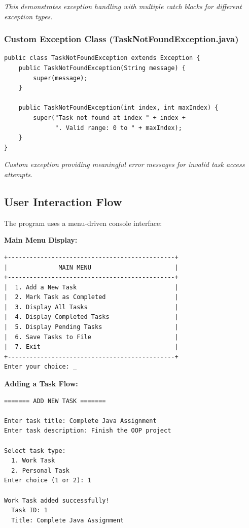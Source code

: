 \documentclass[12pt,a4paper]{article}
\begin{document}
\textit{This demonstrates exception handling with multiple catch blocks for different exception types.}

\subsubsection{Custom Exception Class (TaskNotFoundException.java)}

\begin{lstlisting}[caption={Custom Exception Class}]
public class TaskNotFoundException extends Exception {
    public TaskNotFoundException(String message) {
        super(message);
    }
    
    public TaskNotFoundException(int index, int maxIndex) {
        super("Task not found at index " + index + 
              ". Valid range: 0 to " + maxIndex);
    }
}
\end{lstlisting}

\textit{Custom exception providing meaningful error messages for invalid task access attempts.}

\subsection{User Interaction Flow}

The program uses a menu-driven console interface:

\textbf{Main Menu Display:}
\begin{minipage}{\linewidth}
\begin{verbatim}
+----------------------------------------------+
|              MAIN MENU                       |
+----------------------------------------------+
|  1. Add a New Task                           |
|  2. Mark Task as Completed                   |
|  3. Display All Tasks                        |
|  4. Display Completed Tasks                  |
|  5. Display Pending Tasks                    |
|  6. Save Tasks to File                       |
|  7. Exit                                     |
+----------------------------------------------+
Enter your choice: _
\end{verbatim}
\end{minipage}

\textbf{Adding a Task Flow:}
\begin{minipage}{\linewidth}
\begin{verbatim}
======= ADD NEW TASK =======

Enter task title: Complete Java Assignment
Enter task description: Finish the OOP project

Select task type:
  1. Work Task
  2. Personal Task
Enter choice (1 or 2): 1

Work Task added successfully!
  Task ID: 1
  Title: Complete Java Assignment
\end{verbatim}
\end{minipage}
\end{document}
